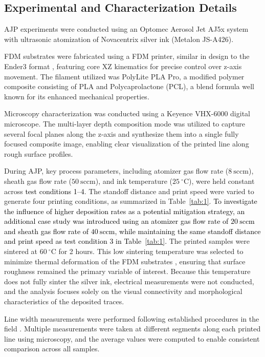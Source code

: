 \documentclass[subscriptcorrection,upint,varvw,balance,hyphenate]{asmejour}
\newcommand{\rev}[1]{\textcolor{black}{#1\xspace}}
\begin{document}
\subsection{Experimental and Characterization Details}
AJP experiments were conducted using an Optomec Aerosol Jet AJ5x system with ultrasonic atomization of Novacentrix silver ink (Metalon JS-A426). 

FDM substrates were fabricated using a FDM printer, similar in design to the Ender3 format , featuring core XZ kinematics for precise control over z-axis movement. The filament utilized was PolyLite PLA Pro, a modified polymer composite consisting of PLA and Polycaprolactone (PCL), a blend formula well known for its enhanced mechanical properties.

Microscopy characterization was conducted using a Keyence VHX-6000 digital microscope. The multi-layer depth composition mode was utilized to capture several focal planes along the z-axis and synthesize them into a single fully focused composite image, enabling clear visualization of the printed line along rough surface profiles.

During AJP, key process parameters, including atomizer gas flow rate (\(8~\mathrm{sccm}\)), sheath gas flow rate (\(50~\mathrm{sccm}\)), and ink temperature (\(25~^{\circ}\mathrm{C}\)), were held constant across \rev{test conditions 1–4}. The standoff distance and print speed were varied to generate four printing conditions, as summarized in Table~\ref{tab:1}. \rev{To investigate the influence of higher deposition rates as a potential mitigation strategy, an additional case study was introduced using an atomizer gas flow rate of \(20~\mathrm{sccm}\) and sheath gas flow rate of \(40~\mathrm{sccm}\), while maintaining the same standoff distance and print speed as test condition 3 in Table~\ref{tab:1}.} The printed samples were sintered at \(60~^{\circ}\mathrm{C}\) for 2 hours. This low sintering temperature was selected to minimize thermal deformation of the FDM substrates \cite{jayanth_effect_2021,Wang2007warpmodel}, ensuring that surface roughness remained the primary variable of interest. Because this temperature does not fully sinter the silver ink, electrical measurements were not conducted, and the analysis focuses solely on the visual connectivity and morphological characteristics of the deposited traces.

Line width measurements were performed following established procedures in the field \cite{zhang2020hybrid,salary2017computational}. Multiple measurements were taken at different segments along each printed line using microscopy, and the average values were computed to enable consistent comparison across all samples.
\end{document}
